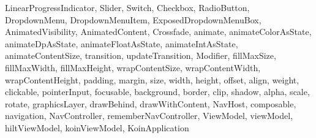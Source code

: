{{    LinearProgressIndicator, Slider, Switch, Checkbox,
    RadioButton, DropdownMenu, DropdownMenuItem,
    ExposedDropdownMenuBox, AnimatedVisibility,
    AnimatedContent, Crossfade, animate,
    animateColorAsState, animateDpAsState,
    animateFloatAsState, animateIntAsState,
    animateContentSize, transition, updateTransition,
    Modifier, fillMaxSize, fillMaxWidth, fillMaxHeight,
    wrapContentSize, wrapContentWidth, wrapContentHeight,
    padding, margin, size, width, height, offset,
    align, weight, clickable, pointerInput, focusable,
    background, border, clip, shadow, alpha, scale,
    rotate, graphicsLayer, drawBehind, drawWithContent,
    NavHost, composable, navigation, NavController,
    rememberNavController, ViewModel, viewModel,
    hiltViewModel, koinViewModel, KoinApplication
  }
}

\lstset{style=Base}

